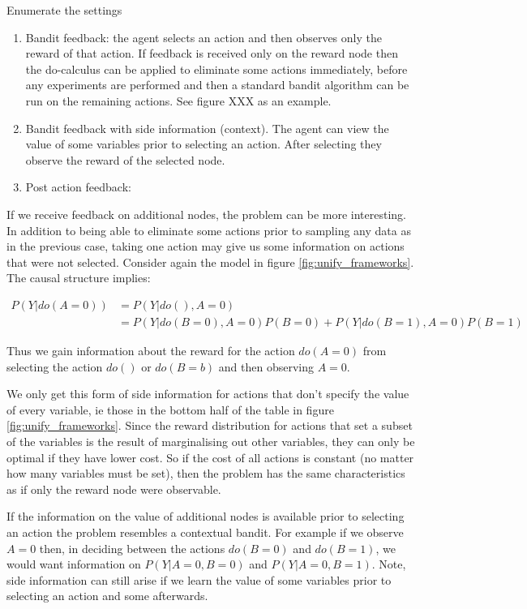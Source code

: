 \documentclass[11pt,a4paper,oneside]{book}
\newcommand{\eqn}[1]{\begin{align}#1\end{align}}
\theoremstyle{plain}
\theoremstyle{definition}
\begin{document}
Enumerate the settings
\begin{enumerate}
\item Bandit feedback: the agent selects an action and then observes only the reward of that action. If feedback is received only on the reward node then the do-calculus can be applied to eliminate some actions immediately, before any experiments are performed and then a standard bandit algorithm can be run on the remaining actions. See figure XXX as an example. 
\item Bandit feedback with side information (context). The agent can view the value of some variables prior to selecting an action. After selecting they observe the reward of the selected node. 
\item Post action feedback:
\end{enumerate}

If we receive feedback on additional nodes, the problem can be more interesting. In addition to being able to eliminate some actions prior to sampling any data as in the previous case, taking one action may give us some information on actions that were not selected. Consider again the model in figure \ref{fig:unify_frameworks}. The causal structure implies: 

\eqn {
P(Y|do(A = 0)) &= P(Y|do(),A = 0) \\
&= P(Y|do(B=0),A=0)P(B=0)+P(Y|do(B=1),A=0)P(B=1) 
}

Thus we gain information about the reward for the action $do(A=0)$ from selecting the action $do()$ or $do(B = b)$ and then observing $A = 0$.  

We only get this form of side information for actions that don't specify the value of every variable, ie those in the bottom half of the table in figure \ref{fig:unify_frameworks}. Since the reward distribution for actions that set a subset of the variables is the result of marginalising out other variables, they can only be optimal if they have lower cost. So if the cost of all actions is constant (no matter how many variables must be set), then the problem has the same characteristics as if only the reward node were observable.

If the information on the value of additional nodes is available prior to selecting an action the problem resembles a contextual bandit. For example if we observe $A = 0$ then, in deciding between the actions $do(B=0)$ and $do(B=1)$, we would want information on $P(Y|A=0,B=0)$ and $P(Y|A=0,B=1)$.  Note, side information can still arise if we learn the value of some variables prior to selecting an action and some afterwards. 
\end{document}

